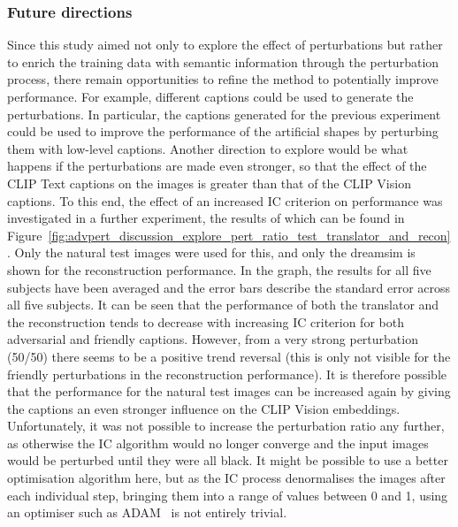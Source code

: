 \subsubsection{Future directions}

Since this study aimed not only to explore the effect of perturbations but rather to enrich the training data with semantic information through the perturbation process, there remain opportunities to refine the method to potentially improve performance. For example, different captions could be used to generate the perturbations. In particular, the captions generated for the previous experiment could be used to improve the performance of the artificial shapes by perturbing them with low-level captions. Another direction to explore would be what happens if the perturbations are made even stronger, so that the effect of the CLIP Text captions on the images is greater than that of the CLIP Vision captions. To this end, the effect of an increased IC criterion on performance was investigated in a further experiment, the results of which can be found in Figure~\ref{fig:advpert_discussion_explore_pert_ratio_test_translator_and_recon}. Only the natural test images were used for this, and only the dreamsim is shown for the reconstruction performance. In the graph, the results for all five subjects have been averaged and the error bars describe the standard error across all five subjects. It can be seen that the performance of both the translator and the reconstruction tends to decrease with increasing IC criterion for both adversarial and friendly captions. However, from a very strong perturbation (50/50) there seems to be a positive trend reversal (this is only not visible for the friendly perturbations in the reconstruction performance). It is therefore possible that the performance for the natural test images can be increased again by giving the captions an even stronger influence on the CLIP Vision embeddings. Unfortunately, it was not possible to increase the perturbation ratio any further, as otherwise the IC algorithm would no longer converge and the input images would be perturbed until they were all black. It might be possible to use a better optimisation algorithm here, but as the IC process denormalises the images after each individual step, bringing them into a range of values between 0 and 1, using an optimiser such as ADAM~\cite{kingmaAdamMethodStochastic2017} is not entirely trivial.


